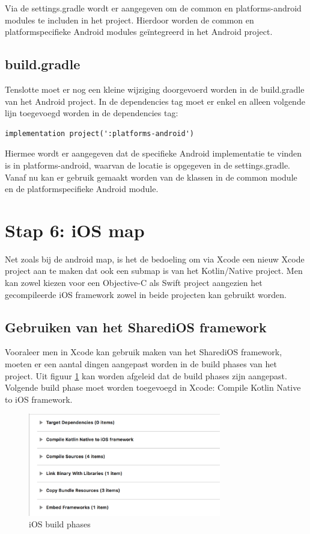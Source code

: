 Via de settings.gradle wordt er aangegeven om de common en platforms-android modules te includen in het project. Hierdoor worden de common en platformspecifieke Android modules geïntegreerd in het Android project.

\subsection{build.gradle}
Tenslotte moet er nog een kleine wijziging doorgevoerd worden in de build.gradle van het Android project. In de dependencies tag moet er enkel en alleen volgende lijn toegevoegd worden in de dependencies tag:

\begin{lstlisting}
implementation project(':platforms-android')
\end{lstlisting}

Hiermee wordt er aangegeven dat de specifieke Android implementatie te vinden is in platforms-android, waarvan de locatie is opgegeven in de settings.gradle. Vanaf nu kan er gebruik gemaakt worden van de klassen in de common module en de platformspecifieke Android module.

\section{Stap 6: iOS map}
\label{sec:ios-stap6}
Net zoals bij de android map, is het de bedoeling om via Xcode een nieuw Xcode project aan te maken dat ook een submap is van het Kotlin/Native project. Men kan zowel kiezen voor een Objective-C als Swift project aangezien het gecompileerde iOS framework zowel in beide projecten kan gebruikt worden.

\subsection{Gebruiken van het SharediOS framework}
Vooraleer men in Xcode kan gebruik maken van het SharediOS framework, moeten er een aantal dingen aangepast worden in de build phases van het project. Uit figuur \ref{fig:stap6-phases} kan worden afgeleid dat de build phases zijn aangepast. Volgende build phase moet worden toegevoegd in Xcode: Compile Kotlin Native to iOS framework.
\begin{figure} [ht]
	\centering
	\includegraphics[width=0.75\textwidth]{img/stap6-phases.png}
	\caption{iOS build phases}
	\label{fig:stap6-phases}
\end{figure}

